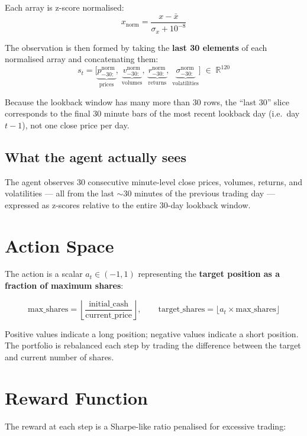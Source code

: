 \documentclass[11pt,a4paper]{article}
\begin{document}
Each array is z-score normalised:
\[
  x_{\text{norm}} = \frac{x - \bar{x}}{\sigma_x + 10^{-8}}
\]

The observation is then formed by taking the \textbf{last 30 elements} of each normalised array and concatenating them:
\[
  s_t = \bigl[\underbrace{p^{\text{norm}}_{-30:\,}}_{\text{prices}},\;
              \underbrace{v^{\text{norm}}_{-30:\,}}_{\text{volumes}},\;
              \underbrace{r^{\text{norm}}_{-30:\,}}_{\text{returns}},\;
              \underbrace{\sigma^{\text{norm}}_{-30:\,}}_{\text{volatilities}}\bigr]
  \;\in\;\mathbb{R}^{120}
\]

Because the lookback window has many more than 30 rows, the ``last 30'' slice corresponds to the final 30 minute bars of the most recent lookback day (i.e.\ day $t{-}1$), not one close price per day.

\subsection{What the agent actually sees}

The agent observes 30 consecutive minute-level close prices, volumes, returns, and volatilities --- all from the last $\sim$30 minutes of the previous trading day --- expressed as z-scores relative to the entire 30-day lookback window.

\section{Action Space}

The action is a scalar $a_t \in (-1, 1)$ representing the \textbf{target position as a fraction of maximum shares}:

\[
  \text{max\_shares} = \left\lfloor \frac{\text{initial\_cash}}{\text{current\_price}} \right\rfloor, \qquad
  \text{target\_shares} = \lfloor a_t \times \text{max\_shares} \rfloor
\]

Positive values indicate a long position; negative values indicate a short position. The portfolio is rebalanced each step by trading the difference between the target and current number of shares.

\section{Reward Function}

The reward at each step is a Sharpe-like ratio penalised for excessive trading:
\end{document}
